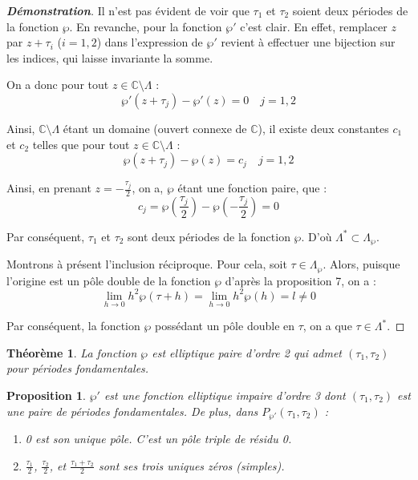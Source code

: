 \documentclass[12pt]{article}
\newtheorem{theorem}{Théorème}
\newtheorem{proposition}{Proposition}
\begin{document}
            \begin{proof}[\textbf{Démonstration}]
            Il n'est pas évident de voir que \(\tau_1\) et \(\tau_2\) soient deux périodes de la fonction \(\wp\). En revanche, pour la fonction \(\wp'\) c'est clair. En effet, remplacer \(z\) par \(z + \tau_i\) (\(i = 1, 2\)) dans l'expression de \(\wp'\) revient à effectuer une bijection sur les indices, qui laisse invariante la somme.

            On a donc pour tout \(z \in \mathbb{C} \setminus \Lambda\) :
            \[
            \wp'(z + \tau_j) - \wp'(z) = 0 \quad j = 1, 2
            \]

            Ainsi, \(\mathbb{C} \setminus \Lambda\) étant un domaine (ouvert connexe de \(\mathbb{C}\)), il existe deux constantes \(c_1\) et \(c_2\) telles que pour tout \(z \in \mathbb{C} \setminus \Lambda\) :
            \[
            \wp(z + \tau_j) - \wp(z) = c_j \quad j = 1, 2
            \]

            Ainsi, en prenant \(z = -\frac{\tau_j}{2}\), on a, \(\wp\) étant une fonction paire, que :
            \[
            c_j = \wp\left(\frac{\tau_j}{2}\right) - \wp\left(-\frac{\tau_j}{2}\right) = 0
            \]

            Par conséquent, \(\tau_1\) et \(\tau_2\) sont deux périodes de la fonction \(\wp\). D'où \(\Lambda^* \subset \Lambda_{\wp}\).

            Montrons à présent l'inclusion réciproque. Pour cela, soit \(\tau \in \Lambda_{\wp}\). Alors, puisque l'origine est un pôle double de la fonction \(\wp\) d'après la proposition 7, on a :
            \[
            \lim_{h \to 0} h^2 \wp(\tau + h) = \lim_{h \to 0} h^2 \wp(h) = l \neq 0
            \]

            Par conséquent, la fonction \(\wp\) possédant un pôle double en \(\tau\), on a que \(\tau \in \Lambda^*\).
            \end{proof}

            \begin{theorem}
            La fonction \(\wp\) est elliptique paire d'ordre 2 qui admet \((\tau_1, \tau_2)\) pour périodes fondamentales.
            \end{theorem}

            \begin{proposition}
            \(\wp'\) est une fonction elliptique impaire d'ordre 3 dont \((\tau_1, \tau_2)\) est une paire de périodes fondamentales. De plus, dans \(P_{\wp'} (\tau_1, \tau_2)\) :
            \begin{enumerate}
                \item 0 est son unique pôle. C'est un pôle triple de résidu 0.
                \item \(\frac{\tau_1}{2}\), \(\frac{\tau_2}{2}\), et \(\frac{\tau_1 + \tau_2}{2}\) sont ses trois uniques zéros (simples).
            \end{enumerate}
            \end{proposition}
\end{document}
